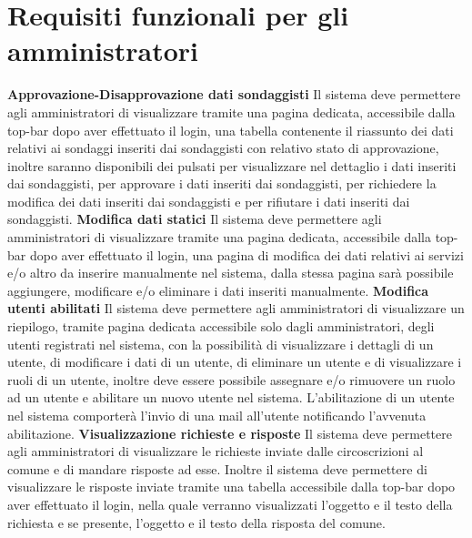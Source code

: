     \section{Requisiti funzionali per gli amministratori}
        \begin{rfList}
            \rfItem \textbf{Approvazione-Disapprovazione dati sondaggisti} Il sistema deve permettere agli amministratori di visualizzare tramite una pagina dedicata, accessibile dalla top-bar dopo aver effettuato il login, una tabella contenente il riassunto dei dati relativi ai sondaggi inseriti dai sondaggisti con relativo stato di approvazione, inoltre saranno disponibili dei pulsati per visualizzare nel dettaglio i dati inseriti dai sondaggisti, per approvare i dati inseriti dai sondaggisti, per richiedere la modifica dei dati inseriti dai sondaggisti e per rifiutare i dati inseriti dai sondaggisti.
            \rfItem \textbf{Modifica dati statici} Il sistema deve permettere agli amministratori di visualizzare tramite una pagina dedicata, accessibile dalla top-bar dopo aver effettuato il login, una pagina di modifica dei dati relativi ai servizi e/o altro da inserire manualmente nel sistema, dalla stessa pagina sarà possibile aggiungere, modificare e/o eliminare i dati inseriti manualmente.
            \rfItem \textbf{Modifica utenti abilitati} Il sistema deve permettere agli amministratori di visualizzare un riepilogo, tramite pagina dedicata accessibile solo dagli amministratori, degli utenti registrati nel sistema, con la possibilità di visualizzare i dettagli di un utente, di modificare i dati di un utente, di eliminare un utente e di visualizzare i ruoli di un utente, inoltre deve essere possibile assegnare e/o rimuovere un ruolo ad un utente e abilitare un nuovo utente nel sistema. L'abilitazione di un utente nel sistema comporterà l'invio di una mail all'utente notificando l'avvenuta abilitazione.
            \rfItem \textbf{Visualizzazione richieste e risposte} Il sistema deve permettere agli amministratori di visualizzare le richieste inviate dalle circoscrizioni al comune e di mandare risposte ad esse. Inoltre il sistema deve permettere di visualizzare le risposte inviate tramite una tabella accessibile dalla top-bar dopo aver effettuato il login, nella quale verranno visualizzati l'oggetto e il testo della richiesta e se presente, l'oggetto e il testo della risposta del comune.
        \end{rfList}
